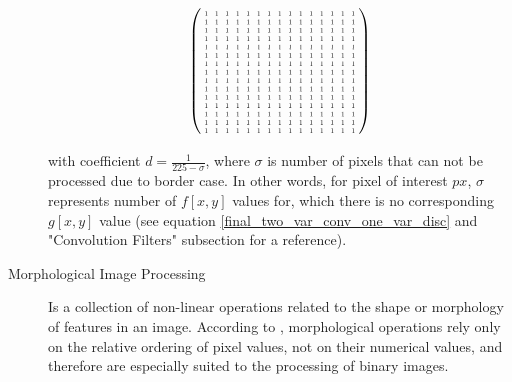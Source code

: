 \documentclass{article}
\newcommand\scalemath[2]{\scalebox{#1}{\mbox{\ensuremath{\displaystyle #2}}}}
\begin{document}
\begin{description}
\[
\left(
    \scalemath{0.5}{
    \begin{array}{ccccccccccccccc}
     1 & 1 & 1 & 1 & 1 & 1 &1 & 1 & 1 & 1 & 1 & 1 & 1 &1 &1\\
     1 & 1 & 1 & 1 & 1 & 1 &1 & 1 & 1 & 1 & 1 & 1 & 1 &1 &1\\
     1 & 1 & 1 & 1 & 1 & 1 &1 & 1 & 1 & 1 & 1 & 1 & 1 &1 &1\\
     1 & 1 & 1 & 1 & 1 & 1 &1 & 1 & 1 & 1 & 1 & 1 & 1 &1 &1\\
     1 & 1 & 1 & 1 & 1 & 1 &1 & 1 & 1 & 1 & 1 & 1 & 1 &1 &1\\
     1 & 1 & 1 & 1 & 1 & 1 &1 & 1 & 1 & 1 & 1 & 1 & 1 &1 &1\\
     1 & 1 & 1 & 1 & 1 & 1 &1 & 1 & 1 & 1 & 1 & 1 & 1 &1 &1\\
     1 & 1 & 1 & 1 & 1 & 1 &1 & 1 & 1 & 1 & 1 & 1 & 1 &1 &1\\
     1 & 1 & 1 & 1 & 1 & 1 &1 & 1 & 1 & 1 & 1 & 1 & 1 &1 &1\\
     1 & 1 & 1 & 1 & 1 & 1 &1 & 1 & 1 & 1 & 1 & 1 & 1 &1 &1\\
     1 & 1 & 1 & 1 & 1 & 1 &1 & 1 & 1 & 1 & 1 & 1 & 1 &1 &1\\
     1 & 1 & 1 & 1 & 1 & 1 &1 & 1 & 1 & 1 & 1 & 1 & 1 &1 &1\\
     1 & 1 & 1 & 1 & 1 & 1 &1 & 1 & 1 & 1 & 1 & 1 & 1 &1 &1\\
     1 & 1 & 1 & 1 & 1 & 1 &1 & 1 & 1 & 1 & 1 & 1 & 1 &1 &1\\
     1 & 1 & 1 & 1 & 1 & 1 &1 & 1 & 1 & 1 & 1 & 1 & 1 &1 &1\\
    \end{array}
    }
  \right)
\] 
 

with coefficient $d = \frac{1}{225 - \sigma}$, where $\sigma$ is number of pixels that can not be processed due to border case. In other words, for pixel of interest $px$, $\sigma$ represents number of $f[x,y]$ values for, which there is no corresponding $g[x,y]$ value (see equation \ref{final_two_var_conv_one_var_disc} and "Convolution Filters" subsection for a reference). 

%
%
\item[Morphological Image Processing] Is a collection of non-linear operations related to the shape or morphology of features in an image. According to \cite{morph_wiki}, morphological operations rely only on the relative ordering of pixel values, not on their numerical values, and therefore are especially suited to the processing of binary images.


\end{description}
\end{document}
